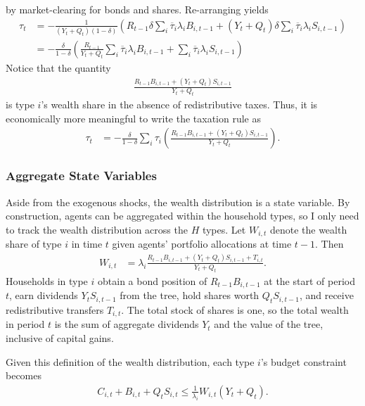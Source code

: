 \documentclass[12 pt, oneside]{article}
\theoremstyle{definition}
\theoremstyle{definition}
\theoremstyle{definition}
\begin{document}
by market-clearing for bonds and shares. Re-arranging yields
\begin{align*}
  \tau_t & = -\frac{1}{(Y_t + Q_t)(1 - \delta)}\left(R_{t - 1}\delta\sum_i \overline{\tau}_i \lambda_i B_{i, t - 1} + (Y_t + Q_t)\delta\sum_i \overline{\tau}_i\lambda_iS_{i, t - 1}\right)\\
         & = -\frac{\delta}{1 - \delta}\left(\frac{R_{t - 1}}{Y_t + Q_t}\sum_i \overline{\tau}_i \lambda_i B_{i, t - 1} + \sum_i \overline{\tau}_i\lambda_iS_{i, t - 1}\right)
\end{align*}
Notice that the quantity
\begin{align*}
  \frac{R_{t - 1}B_{i, t - 1} + (Y_t + Q_t)S_{i, t - 1}}{Y_t + Q_t}
\end{align*}
is type $i$'s wealth share in the absence of redistributive taxes. Thus, it is economically more meaningful to write the taxation rule as
\begin{align}\label{eq:common tax rate}
  \tau_t & = -\frac{\delta}{1 - \delta}\sum_i\tau_i\left(\frac{R_{t - 1}B_{i, t - 1} + (Y_t + Q_t)S_{i, t - 1}}{Y_t + Q_t}\right).
\end{align}

\subsubsection{Aggregate State Variables}
Aside from the exogenous shocks, the wealth distribution is a state variable. By construction, agents can be aggregated within the household types, so I only need to track the wealth distribution across the $H$ types. Let $W_{i, t}$ denote the wealth share of type $i$ in time $t$ given agents' portfolio allocations at time $t - 1$. Then
\begin{align}\label{eq:wealth share defn}
  W_{i, t} & = \lambda_i\frac{R_{t - 1}B_{i, t - 1} + (Y_t + Q_t) S_{i, t - 1} + T_{i, t}}{Y_t + Q_t}.
\end{align}
Households in type $i$ obtain a bond position of $R_{t - 1} B_{i, t - 1}$ at the start of period $t$,
earn dividends $Y_t S_{i, t - 1}$ from the tree, hold shares worth $Q_t S_{i, t - 1}$, and receive redistributive transfers $T_{i, t}$.
The total stock of shares is one, so the total wealth in period $t$ is the sum of aggregate dividends $Y_t$ and the value of the tree, inclusive of capital gains.

Given this definition of the wealth distribution, each type $i$'s budget constraint becomes
\begin{align}\label{eq:hh budget constraint with wealth share}
  C_{i, t} + B_{i, t} + Q_t S_{i, t}\leq \frac{1}{\lambda_i} W_{i, t} (Y_t +  Q_t).
\end{align}
\end{document}
